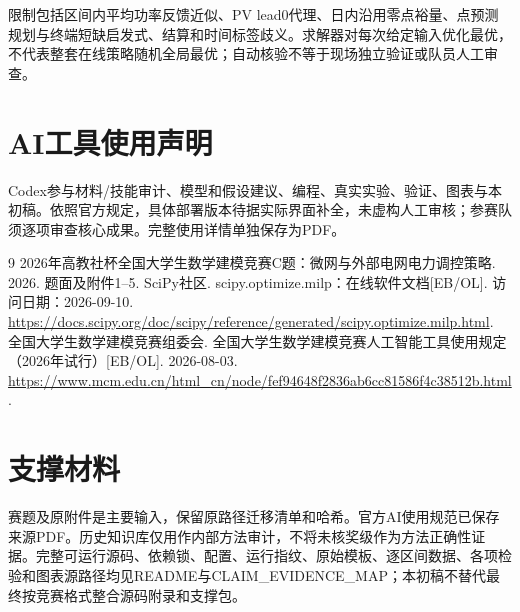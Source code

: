 \documentclass[UTF8,11pt,a4paper]{ctexart}
\begin{document}
限制包括区间内平均功率反馈近似、PV lead0代理、日内沿用零点裕量、点预测规划与终端短缺启发式、结算和时间标签歧义。求解器对每次给定输入优化最优，不代表整套在线策略随机全局最优；自动核验不等于现场独立验证或队员人工审查。

\section*{AI工具使用声明}
Codex参与材料/技能审计、模型和假设建议、编程、真实实验、验证、图表与本初稿。依照官方规定\cite{ai}，具体部署版本待据实际界面补全，未虚构人工审核；参赛队须逐项审查核心成果。完整使用详情单独保存为PDF。
\begin{thebibliography}{9}
 2026年高教社杯全国大学生数学建模竞赛C题：微网与外部电网电力调控策略. 2026. 题面及附件1--5.
 SciPy社区. scipy.optimize.milp：在线软件文档[EB/OL]. 访问日期：2026-09-10. \url{https://docs.scipy.org/doc/scipy/reference/generated/scipy.optimize.milp.html}.
 全国大学生数学建模竞赛组委会. 全国大学生数学建模竞赛人工智能工具使用规定（2026年试行）[EB/OL]. 2026-08-03. \url{https://www.mcm.edu.cn/html_cn/node/fef94648f2836ab6cc81586f4c38512b.html}.
\end{thebibliography}
\section*{支撑材料}
赛题及原附件是主要输入，保留原路径迁移清单和哈希。官方AI使用规范已保存来源PDF。历史知识库仅用作内部方法审计，不将未核奖级作为方法正确性证据。完整可运行源码、依赖锁、配置、运行指纹、原始模板、逐区间数据、各项检验和图表源路径均见README与CLAIM\_EVIDENCE\_MAP；本初稿不替代最终按竞赛格式整合源码附录和支撑包。
\clearpage
\appendix

\end{document}
